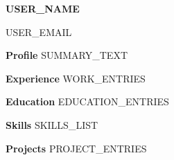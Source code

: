 \documentclass[10pt,a4paper]{article}
\newcommand{\heading}[1]{\vspace{0.8em}\textbf{#1}\vspace{0.3em}}
\begin{document}
{\Large\bfseries {{USER_NAME}}}

\vspace{0.3em}
{\small {{USER_EMAIL}} }

\vspace{1em}

\heading{Profile}
{{SUMMARY_TEXT}}

\vspace{0.5em}

\heading{Experience}
{{WORK_ENTRIES}}

\vspace{0.5em}

\heading{Education}
{{EDUCATION_ENTRIES}}

\vspace{0.5em}

\heading{Skills}
{{SKILLS_LIST}}

\vspace{0.5em}

\heading{Projects}
{{PROJECT_ENTRIES}}
\end{document}
